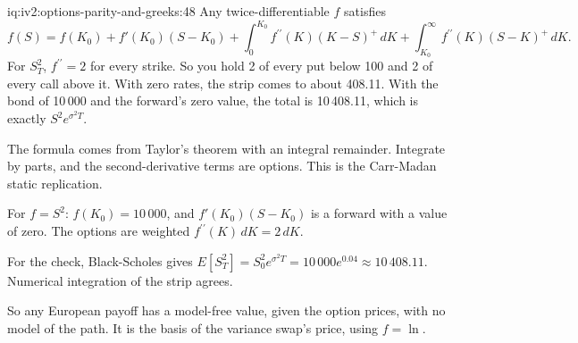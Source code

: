\begin{solution}{iq:iv2:options-parity-and-greeks:48}
Any twice-differentiable $f$ satisfies
\[
f(S) = f(K_0) + f'(K_0)(S - K_0) + \int_0^{K_0}f^{\prime\prime}(K)(K - S)^+\,dK + \int_{K_0}^\infty f^{\prime\prime}(K)(S - K)^+\,dK.
\]
For $S_T^2$, $f^{\prime\prime} = 2$ for every strike. So you hold 2 of every put below 100 and 2 of every call above it. With zero rates, the strip comes to about 408.11. With the bond of 10\,000 and the forward's zero value, the total is 10\,408.11, which is exactly $S^2e^{\sigma^2T}$.

The formula comes from Taylor's theorem with an integral remainder. Integrate by parts, and the second-derivative terms are options. This is the Carr-Madan static replication.

For $f = S^2$: $f(K_0) = 10\,000$, and $f'(K_0)(S - K_0)$ is a forward with a value of zero. The options are weighted $f^{\prime\prime}(K)\,dK = 2\,dK$.

For the check, Black-Scholes gives $E[S_T^2] = S_0^2e^{\sigma^2T} = 10\,000e^{0.04} \approx 10\,408.11$. Numerical integration of the strip agrees.

So any European payoff has a model-free value, given the option prices, with no model of the path. It is the basis of the variance swap's price, using $f = \ln$.

\end{solution}

